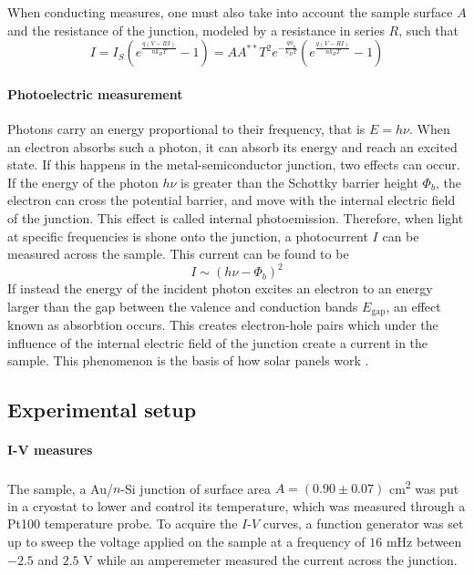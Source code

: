 When conducting measures, one must also take into account the sample surface $A$ and the resistance of the junction, modeled by a resistance in series $R$, such that
\begin{equation} \label{eq:iv_curve}
    I = I_S \left( e^{\frac{q (V- RI)}{n k_B T}} - 1\right) = A A^{**} T^2 e^{-\frac{q\phi_b}{k_BT}} \left( e^{\frac{q (V- RI)}{n k_B T}} - 1\right)
\end{equation}


\paragraph{Photoelectric measurement}
Photons carry an energy proportional to their frequency, that is $E = h \nu$.
When an electron absorbs such a photon, it can absorb its energy and reach an excited state.
If this happens in the metal-semiconductor junction, two effects can occur.
If the energy of the photon $h\nu$ is greater than the Schottky barrier height $\Phi_b$, the electron can cross the potential barrier, and move with the internal electric field of the junction.
This effect is called internal photoemission.
Therefore, when light at specific frequencies is shone onto the junction, a photocurrent $I$ can be measured across the sample.
This current can be found to be \cite{notice}
\begin{equation}
    I \sim (h \nu - \Phi_b)^2
    \label{eq:fowler}
\end{equation}
If instead the energy of the incident photon excites an electron to an energy larger than the gap between the valence and conduction bands $E_\textrm{gap}$, an effect known as absorbtion occurs.
This creates electron-hole pairs which under the influence of the internal electric field of the junction create a current in the sample.
This phenomenon is the basis of how solar panels work \cite{notice}.

\subsection{Experimental setup}
\paragraph{I-V measures}
The sample, a Au/$n$-Si junction of surface area $A = (0.90 \pm 0.07)$ \unit{\cm\squared} was put in a cryostat to lower and control its temperature, which was measured through a Pt100 temperature probe.
To acquire the $I$-$V$ curves, a function generator was set up to sweep the voltage applied on the sample at a frequency of $16$ mHz between $-2.5$ and $2.5$ V while an amperemeter measured the current across the junction. 

